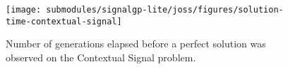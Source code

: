 \begin{figure}[h]

\centering
\texttt{[image: submodules/signalgp-lite/joss/figures/solution-time-contextual-signal]}

\caption{%
Number of generations elapsed before a perfect solution was observed on the Contextual Signal problem.
} \label{fig:tts-context}

\end{figure}
